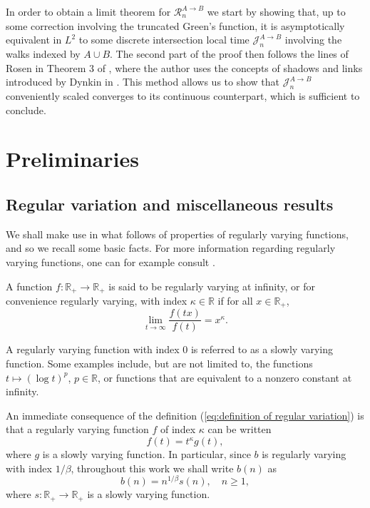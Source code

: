 \documentclass[12pt]{article}
\newcommand{\RR}{\mathbb R}
\newcommand{\R}{\mathcal R}
\newcommand{\J}{\mathcal J}
\newcommand{\1}{\mathds{1}}
\numberwithin{equation}{section}
\begin{document}
In order to obtain a limit theorem for $\R_n^{A\rightarrow B}$ we start by showing that, up to some correction involving the truncated Green's function, it is asymptotically equivalent in $L^2$ to some discrete intersection local time $\J_n^{A\rightarrow B}$ involving the walks indexed by $A\cup B$. The second part of the proof then follows the lines of Rosen in Theorem $3$ of \cite{RosenRandomWalks&IntersectionLocalTimes1990}, where the author uses the concepts of shadows and links introduced by Dynkin in \cite{DynkinSelf-IntersectionGauge1988}. This method allows us to show that $\J_n^{A\rightarrow B}$ conveniently scaled converges to its continuous counterpart, which is sufficient to conclude.

\section{Preliminaries}
\label{section:Preliminary Results}

\subsection{Regular variation and miscellaneous results}

We shall make use in what follows of properties of regularly varying functions, and so we recall some basic facts. For more information regarding regularly varying functions, one can for example consult \cite{BinghamGoldieTeugelsRegularVariation1987}.

A function $f:\RR_+\rightarrow\RR_+$ is said to be regularly varying at infinity, or for convenience regularly varying, with index $\kappa\in\RR$ if for all $x\in\RR_+$,
\begin{equation}
\label{eq:definition of regular variation}
    \lim_{t\rightarrow\infty}\frac{f(tx)}{f(t)}=x^\kappa.
\end{equation} 

A regularly varying function with index $0$ is referred to as a slowly varying function. Some examples include, but are not limited to, the functions $t\mapsto(\log t)^p$, $p\in\RR$, or functions that are equivalent to a nonzero constant at infinity.

An immediate consequence of the definition (\ref{eq:definition of regular variation}) is that a regularly varying function $f$ of index $\kappa$ can be written
\begin{equation*}
    f(t)=t^\kappa g(t),
\end{equation*}
where $g$ is a slowly varying function. In particular, since $b$ is regularly varying with index $1/\beta$, throughout this work we shall write $b(n)$ as
\begin{equation*}
    b(n)=n^{1/\beta}s(n), \quad n\ge1,
\end{equation*}
where $s:\RR_+\rightarrow\RR_+$ is a slowly varying function.
\end{document}

